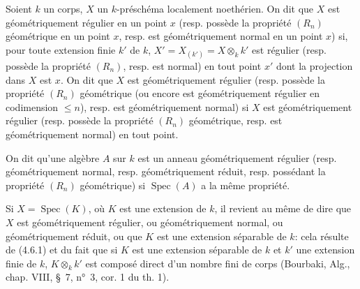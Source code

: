 \begin{definition}[6.7.6]
\label{IV.2.s6.7.6-fr}
Soient $k$ un corps, $X$ un $k$-préschéma localement noethérien. On dit
que $X$ est géométriquement régulier en un point $x$ (resp. possède la
propriété $(R_n)$ géométrique en un point $x$, resp. est géométriquement
normal en un point $x$) si, pour toute extension finie $k'$ de $k$,
$X'=X_{(k')}=X\otimes_k k'$ est régulier (resp. possède la propriété
$(R_n)$, resp. est normal) en tout point $x'$ dont la projection dans
$X$ est $x$. On dit que $X$ est géométriquement régulier (resp. possède
la propriété $(R_n)$ géométrique (ou encore est géométriquement régulier
en codimension $\leqslant n$), resp. est géométriquement normal) si $X$
est géométriquement régulier (resp. possède la propriété $(R_n)$
géométrique, resp. est géométriquement normal) en tout point.

On dit qu'une algèbre $A$ sur $k$ est un anneau géométriquement régulier
(resp. géométriquement normal, resp. géométriquement réduit, resp.
possédant la propriété $(R_n)$ géométrique) si $\operatorname{Spec}(A)$
a la même propriété.

Si $X=\operatorname{Spec}(K)$, où $K$ est une extension de $k$, il revient
au même de dire que $X$ est géométriquement régulier, ou géométriquement
normal, ou géométriquement réduit, ou que $K$ est une extension séparable
de $k$: cela résulte de (4.6.1) et du fait que si $K$ est une extension
séparable de $k$ et $k'$ une extension finie de $k$, $K\otimes_k k'$ est
composé direct d'un nombre fini de corps (Bourbaki, Alg., chap. VIII,
§~7, n°~3, cor. 1 du th. 1).
\end{definition}


